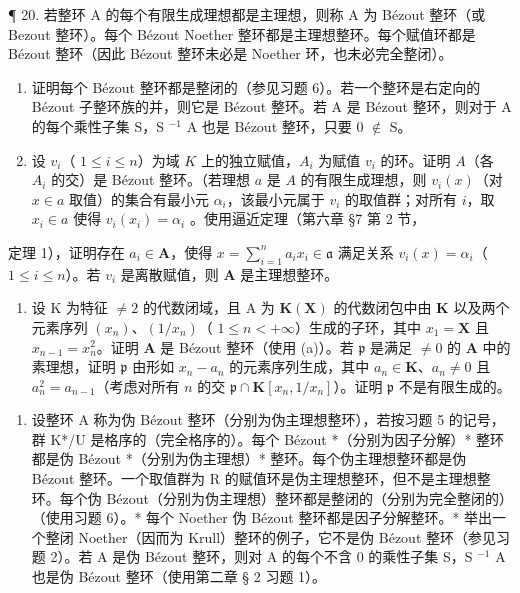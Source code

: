 ¶ 20. 若整环 A 的每个有限生成理想都是主理想，则称 A 为 Bézout 整环（或 Bezout 整环）。每个 Bézout Noether 整环都是主理想整环。每个赋值环都是 Bézout 整环（因此 Bézout 整环未必是 Noether 环，也未必完全整闭）。

\begin{enumerate}
\def\labelenumi{(\alph{enumi})}
\item
  证明每个 Bézout 整环都是整闭的（参见习题 6）。若一个整环是右定向的 Bézout 子整环族的并，则它是 Bézout 整环。若 A 是 Bézout 整环，则对于 A 的每个乘性子集 S，S \(^{-1}\) A 也是 Bézout 整环，只要 0 \(\notin\) S。
\item
  设 \(v_{i}\)（ \(1 \leqslant i \leqslant n\)）为域 \(K\) 上的独立赋值，\(A_{i}\) 为赋值 \(v_{i}\) 的环。证明 \(A\)（各 \(A_{i}\) 的交）是 Bézout 整环。（若理想 \(a\) 是 \(A\) 的有限生成理想，则 \(v_{i}(x)\)（对 \(x \in a\) 取值）的集合有最小元 \(\alpha_{i}\)，该最小元属于 \(v_{i}\) 的取值群；对所有 \(i\)，取 \(x_{i} \in a\) 使得 \(v_{i}(x_{i}) = \alpha_{i}\) 。使用逼近定理（第六章 §7 第 2 节，
\end{enumerate}

定理 1），证明存在 \(a_i \in \mathbf{A}\)，使得 \(x = \sum_{i=1}^{n} a_i x_i \in \mathfrak{a}\) 满足关系 \(v_i(x) = \alpha_i\)（\(1 \leqslant i \leqslant n\)）。若 \(v_i\) 是离散赋值，则 \(\mathbf{A}\) 是主理想整环。

\begin{enumerate}
\def\labelenumi{(\alph{enumi})}
\setcounter{enumi}{2}
\tightlist
\item
  设 K 为特征 \(\neq2\) 的代数闭域，且 A 为 \(\mathbf{K}(\mathbf{X})\) 的代数闭包中由 \(\mathbf{K}\) 以及两个元素序列 \((x_{n})\)、\((1 / x_{n})\)（ \(1 \leqslant n < +\infty\)）生成的子环，其中 \(x_{1} = \mathbf{X}\) 且 \(x_{n-1} = x_{n}^{2}\)。证明 \(\mathbf{A}\) 是 Bézout 整环（使用 (a)）。若 \(\mathfrak{p}\) 是满足 \(\neq 0\) 的 \(\mathbf{A}\) 中的素理想，证明 \(\mathfrak{p}\) 由形如 \(x_{n} - a_{n}\) 的元素序列生成，其中 \(a_{n} \in \mathbf{K}\)、\(a_{n} \neq 0\) 且 \(a_{n}^{2} = a_{n-1}\)（考虑对所有 \(n\) 的交 \(\mathfrak{p} \cap \mathbf{K}[x_{n}, 1 / x_{n}]\)）。证明 \(\mathfrak{p}\) 不是有限生成的。
\end{enumerate}

\begin{enumerate}
\def\labelenumi{\arabic{enumi}.}
\setcounter{enumi}{20}
\tightlist
\item
  设整环 A 称为伪 Bézout 整环（分别为伪主理想整环），若按习题 5 的记号，群 K*/U 是格序的（完全格序的）。每个 Bézout *（分别为因子分解）* 整环都是伪 Bézout *（分别为伪主理想）* 整环。每个伪主理想整环都是伪 Bézout 整环。一个取值群为 R 的赋值环是伪主理想整环，但不是主理想整环。每个伪 Bézout（分别为伪主理想）整环都是整闭的（分别为完全整闭的）（使用习题 6）。* 每个 Noether 伪 Bézout 整环都是因子分解整环。* 举出一个整闭 Noether（因而为 Krull）整环的例子，它不是伪 Bézout 整环（参见习题 2）。若 A 是伪 Bézout 整环，则对 A 的每个不含 0 的乘性子集 S，S \(^{-1}\) A 也是伪 Bézout 整环（使用第二章 § 2 习题 1）。
\end{enumerate}

